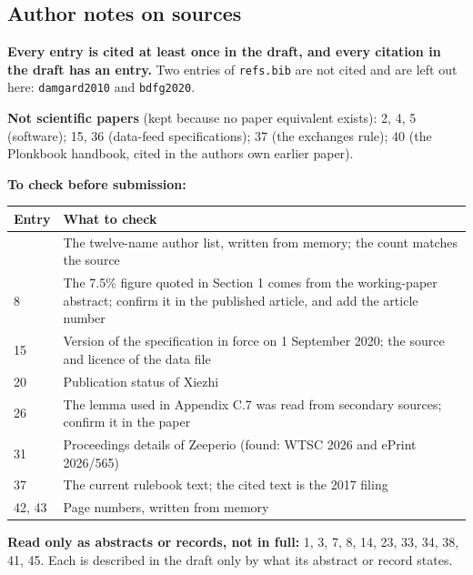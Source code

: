 \subsection{Author notes on sources}

\textbf{Every entry is cited at least once in the draft, and every citation in the draft has an entry.} Two entries of \texttt{refs.bib} are not cited and are left out here: \texttt{damgard2010} and \texttt{bdfg2020}.

\textbf{Not scientific papers} (kept because no paper equivalent exists): 2, 4, 5 (software); 15, 36 (data-feed specifications); 37 (the exchange\textquotesingle s rule); 40 (the Plonkbook handbook, cited in the authors\textquotesingle{} own earlier paper).

\textbf{To check before submission:}

\begin{longtable}[]{@{}ll@{}}
\toprule\noalign{}
Entry & What to check \\
\midrule\noalign{}
\endhead
\bottomrule\noalign{}
\endlastfoot
7 & The twelve-name author list, written from memory; the count matches the source \\
8 & The 7.5\% figure quoted in Section 1 comes from the working-paper abstract; confirm it in the published article, and add the article number \\
15 & Version of the specification in force on 1 September 2020; the source and licence of the data file \\
20 & Publication status of Xiezhi \\
26 & The lemma used in Appendix C.7 was read from secondary sources; confirm it in the paper \\
31 & Proceedings details of Zeeperio (found: WTSC 2026 and ePrint 2026/565) \\
37 & The current rulebook text; the cited text is the 2017 filing \\
42, 43 & Page numbers, written from memory \\
\end{longtable}

\textbf{Read only as abstracts or records, not in full:} 1, 3, 7, 8, 14, 23, 33, 34, 38, 41, 45. Each is described in the draft only by what its abstract or record states.
